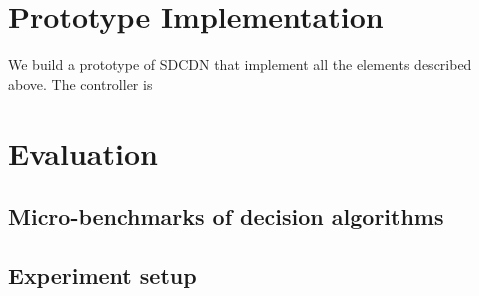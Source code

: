 \section{Prototype Implementation}

We build a prototype of SDCDN that implement all the elements described above. The controller is 

\section{Evaluation}

\subsection{Micro-benchmarks of decision algorithms}

\subsection{Experiment setup}
